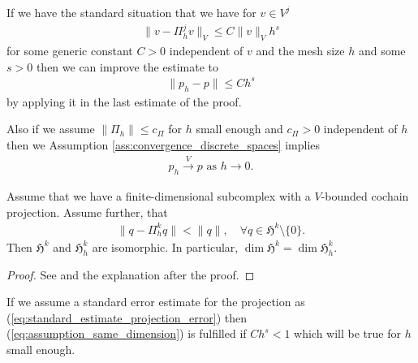 \documentclass[../master_thesis.tex]{subfiles}
\begin{document}
If we have the standard situation that 
we have for $v \in V^j$
\begin{align}
    \lVert v - \Pi^j_h v \rVert _V \leq C \lVert v  \rVert _V h^s \label{eq:standard_estimate_projection_error}
\end{align}
for some generic constant $C>0$ independent of $v$ and the mesh size $h$ and some 
$s>0$ then we can improve the estimate to
\begin{align*}
    \lVert p_h - p \rVert \leq C h^s
\end{align*}
by applying it in the last estimate of the proof.

Also if we assume $\lVert \Pi_h \rVert \leq c_\Pi$ for $h$ small enough and 
$c_\Pi > 0 $ independent of $h$ then we Assumption \ref{ass:convergence_discrete_spaces} implies
\begin{align*}
    p_h \xrightarrow{V} p \text{ as } h \rightarrow 0.
\end{align*}

\begin{theorem}\label{thm:dim_of_discrete_harmonic_space}
    Assume that we have a finite-dimensional subcomplex
    with a $V$-bounded cochain projection. Assume further, that 
    \begin{align}
        \lVert q - \Pi_h^k q \rVert < \lVert q \rVert, \quad \forall q \in \mathfrak{H}^k\setminus \{0\}.
        \label{eq:assumption_same_dimension}
    \end{align}
    Then $\mathfrak{H}^k$ and $\mathfrak{H}^k_h$ are isomorphic. 
    In particular, $\dim \mathfrak{H}^k = \dim \mathfrak{H}^k_h$.
\end{theorem}
\begin{proof}
    See \cite[Thm\,5.1]{arnold} and the explanation after the proof.
\end{proof}
If we assume a standard error estimate for the projection as (\ref{eq:standard_estimate_projection_error})
then (\ref{eq:assumption_same_dimension}) is fulfilled if $C h^s < 1$ which will be true 
for $h$ small enough.
\end{document}
